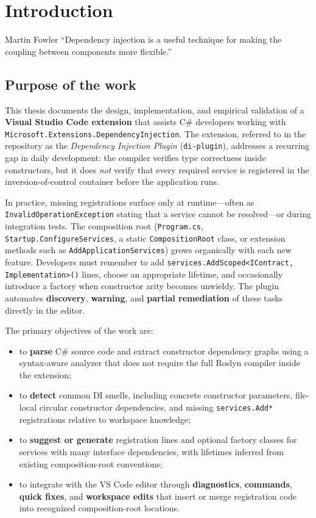 \chapter[Introduction]{Introduction}
\label{chap1:intro}
\begin{chapquote}{Martin Fowler}
``Dependency injection is a useful technique for making the coupling between components more flexible.''
\end{chapquote}

\section{Purpose of the work}
\label{chap1:purpose}

This thesis documents the design, implementation, and empirical validation of a \textbf{Visual Studio Code extension} that assists C\# developers working with \texttt{Microsoft.Extensions.DependencyInjection}. The extension, referred to in the repository as the \emph{Dependency Injection Plugin} (\texttt{di-plugin}), addresses a recurring gap in daily development: the compiler verifies type correctness inside constructors, but it does \emph{not} verify that every required service is registered in the inversion-of-control container before the application runs.

In practice, missing registrations surface only at runtime---often as \texttt{InvalidOperationException} stating that a service cannot be resolved---or during integration tests. The composition root (\texttt{Program.cs}, \texttt{Startup.ConfigureServices}, a static \texttt{CompositionRoot} class, or extension methods such as \texttt{AddApplicationServices}) grows organically with each new feature. Developers must remember to add \texttt{services.AddScoped<IContract, Implementation>()} lines, choose an appropriate lifetime, and occasionally introduce a factory when constructor arity becomes unwieldy. The plugin automates \textbf{discovery}, \textbf{warning}, and \textbf{partial remediation} of these tasks directly in the editor.

The primary objectives of the work are:
\begin{itemize}
	\item to \textbf{parse} C\# source code and extract constructor dependency graphs using a syntax-aware analyzer that does not require the full Roslyn compiler inside the extension;
	\item to \textbf{detect} common DI smells, including concrete constructor parameters, file-local circular constructor dependencies, and missing \texttt{services.Add*} registrations relative to workspace knowledge;
	\item to \textbf{suggest or generate} registration lines and optional factory classes for services with many interface dependencies, with lifetimes inferred from existing composition-root conventions;
	\item to integrate with the VS Code editor through \textbf{diagnostics}, \textbf{commands}, \textbf{quick fixes}, and \textbf{workspace edits} that insert or merge registration code into recognized composition-root locations.
\end{itemize}

